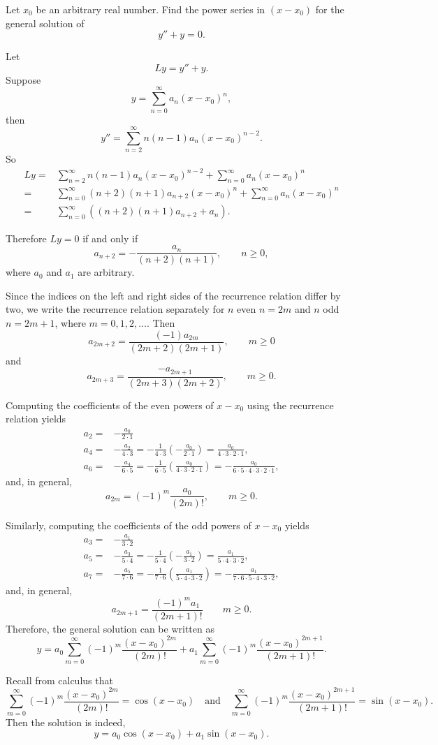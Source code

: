 \begin{exercise}
  Let $x_0$ be an arbitrary real number. Find the power series in  $(x-x_0)$ for the general solution of
  \[y''+y=0.\]
\end{exercise}
\begin{exersol}
Let
\[Ly=y''+y.\]
Suppose
\[y=\sum_{n=0}^\infty a_n(x-x_0)^n,\]
then
\[y''=\sum_{n=2}^\infty n(n-1)a_n(x-x_0)^{n-2}.\]
So
\[
\begin{aligned}
  Ly
  =&\sum_{n=2}^\infty n(n-1)a_n(x-x_0)^{n-2}+\sum_{n=0}^\infty a_n(x-x_0)^n\\
  =&\sum_{n=0}^\infty (n+2)(n+1)a_{n+2}(x-x_0)^n+\sum_{n=0}^\infty a_n(x-x_0)^n\\
  =&\sum_{n=0}^\infty ((n+2)(n+1)a_{n+2}+a_n).
\end{aligned}  
\]

Therefore $Ly=0$ if and only if
\[a_{n+2}=-\frac{a_n}{(n+2)(n+1)},\qquad n\ge 0,\]
where $a_0$ and $a_1$ are arbitrary.

Since the indices on the left and right sides of the recurrence relation differ by two, we write the recurrence relation separately for $n$ even $n=2m$ and $n$ odd $n=2m+1$, where $m=0, 1, 2, \dots$. Then
\[a_{2m+2} =\dfrac{(-1)a_{2m}}{(2m+2)(2m+1)},\qquad m\ge 0\]
and
\[a_{2m+3} = \dfrac{-a_{2m+1}}{(2m+3)(2m+2)},\qquad m\ge0.\]

Computing the coefficients of the even powers of $x-x_0$ using the recurrence relation yields
\[
  \begin{aligned} 
    a_2 =& -\frac{a_0}{2\cdot1}\\
    a_4 =& -\frac{a_2}{4\cdot3}=-\frac{1}{4\cdot3} \left(-\frac{a_0}{2\cdot1}\right)= \frac{a_0}{4\cdot3\cdot2\cdot1}, \\ 
    a_6 =& -\frac{a_4}{6\cdot5}=-\frac{1}{6\cdot5} \left(\frac{a_0}{4\cdot3\cdot2\cdot1}\right) =-\frac{a_0}{6\cdot5\cdot4\cdot3\cdot 2\cdot1},
  \end{aligned} 
  \]
and, in general,
\[a_{2m}=(-1)^m \frac{a_0}{(2m)!},\qquad m\ge 0.\]

Similarly, computing the coefficients of the odd powers of $x-x_0$ yields
\[
  \begin{aligned} 
    a_3 =& -\frac{a_1}{3\cdot2}\\
    a_5 =& -\frac{a_3}{5\cdot4}=-\frac{1}{5\cdot4} \left(-\frac{a_1}{3\cdot2}\right)= \frac{a_1}{5\cdot4\cdot3\cdot2}, \\ 
    a_7 =& -\frac{a_5}{7\cdot6}
    =-\frac{1}{7\cdot6} \left(\frac{a_1}{5\cdot4\cdot3\cdot2}\right)
    =-\frac{a_1}{7\cdot6\cdot5\cdot4\cdot 3\cdot2},
  \end{aligned}
\]
and, in general,
\[a_{2m+1}=\frac{(-1)^m a_1}{(2m+1)!}\qquad m\ge 0.\]
Therefore, the general solution can be written as
\[
  y=a_0\sum_{m=0}^\infty(-1)^m\frac{(x-x_0)^{2m}}{(2m)!} +a_1\sum_{m=0}^\infty(-1)^m\frac{(x-x_0)^{2m+1}}{(2m+1)!}.
\]

Recall from calculus that
\[\sum_{m=0}^\infty(-1)^m\frac{(x-x_0)^{2m}}{(2m)!}=\cos(x-x_0) \quad \text{and} \quad \sum_{m=0}^\infty(-1)^m\frac{(x-x_0)^{2m+1}}{(2m+1)!}=\sin(x-x_0).\]
Then the solution is indeed,
\[y=a_0\cos(x-x_0)+a_1\sin(x-x_0).\]
\end{exersol}

